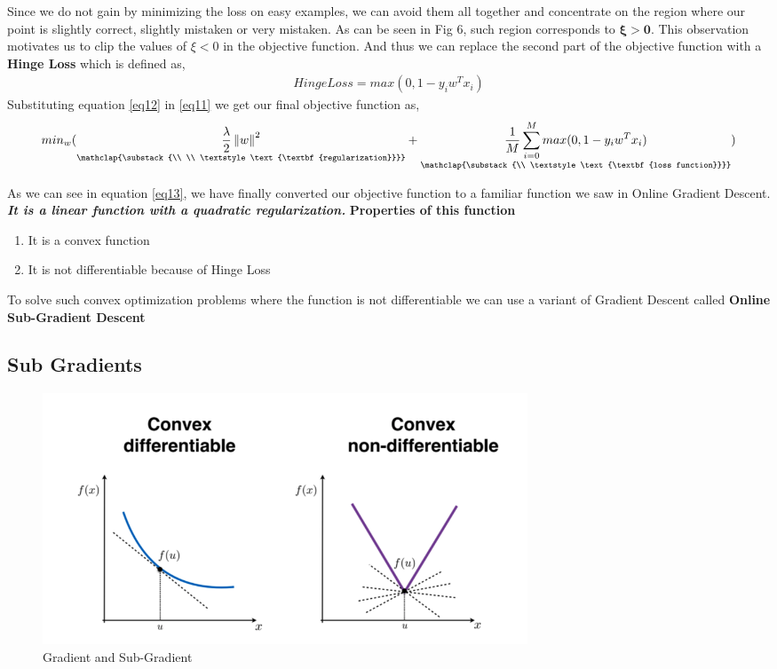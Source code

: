 \documentclass[11pt]{article}
\newcommand{\norm}[1]{\left\lVert#1\right\rVert}
\begin{document}
Since we do not gain by minimizing the loss on easy examples, we can avoid them all together and concentrate on the region where our point is slightly correct, slightly mistaken or very mistaken. As can be seen in Fig 6, such region corresponds to \(\boldsymbol{\xi > 0}\). 
This observation motivates us to clip the values of \(\xi < 0\) in the objective function. And thus we can replace the second part of the objective function with a \textbf{Hinge Loss} which is defined as,
\begin{align}
     Hinge Loss = max(0, 1- y_{i}w^Tx_{i}) \label{eq12}
\end{align}
Substituting equation \ref{eq12} in \ref{eq11} we get our final objective function as, 
\begin{align}
     min_{w}(\underset{\mathclap{\substack{\\ \\ \textstyle \text{\textbf{regularization}}}}}{\frac{\lambda}{2}\norm{w}^2}+\underset{\mathclap{\substack{\\ \textstyle \text{\textbf{loss function}}}}}{\frac{1}{M}\sum_{i=0}^{M} max(0, 1-y_{i}w^Tx_{i})}) \label{eq13}
\end{align}

As we can see in equation \ref{eq13}, we have finally converted our objective function to a familiar function we saw in Online Gradient Descent. \textit{\textbf{It is a linear function with a quadratic regularization.}}
\newpage
\textbf{Properties of this function}
\begin{enumerate}
    \item It is a convex function
    \item It is not differentiable because of Hinge Loss
\end{enumerate}

To solve such convex optimization problems where the function is not differentiable we can use a variant of Gradient Descent called \textbf{Online Sub-Gradient Descent}

\subsection{Sub Gradients}
\begin{figure}[!htp]
        \centering
        \includegraphics[width=0.7\textwidth]{images/SubGradient.png}
        \caption{Gradient and Sub-Gradient}
\end{figure}
\end{document}
